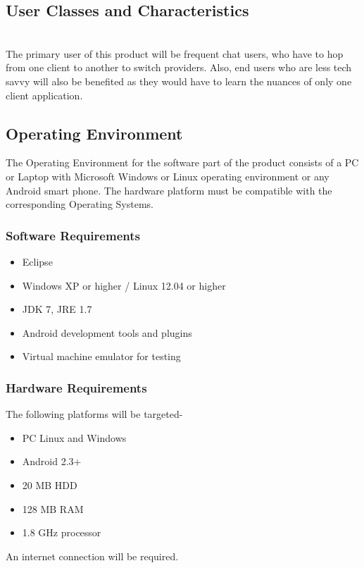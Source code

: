 \documentclass{SureshLimkar}
\begin{document}
\subsection{User Classes and Characteristics}
\hspace{0.5 in}\\The primary user of this product will be frequent chat users, who have to hop from one client to another to switch providers. Also, end users who are less tech savvy will also be benefited as they would have to learn the nuances of only one client application.
\\

\subsection{Operating Environment}
\hspace{0.5 in}The Operating Environment for the software part of the product consists of a PC or Laptop with Microsoft Windows or Linux operating environment or any Android smart phone. The hardware platform must be compatible with the corresponding Operating Systems.
\subsubsection{Software Requirements}
\begin{itemize}
	\item Eclipse
	\item Windows XP or higher / Linux 12.04 or higher
	\item JDK 7, JRE 1.7
	\item Android development tools and plugins
	\item Virtual machine emulator for testing
\end{itemize}
\subsubsection{Hardware Requirements}
The following platforms will be targeted-
\begin{itemize}
 \item PC Linux and Windows
 \item Android 2.3+
\end{itemize}

\begin{itemize}
	\item 20 MB HDD
	\item 128 MB RAM
	\item 1.8 GHz processor
\end{itemize}
An internet connection will be required.
\end{document}
